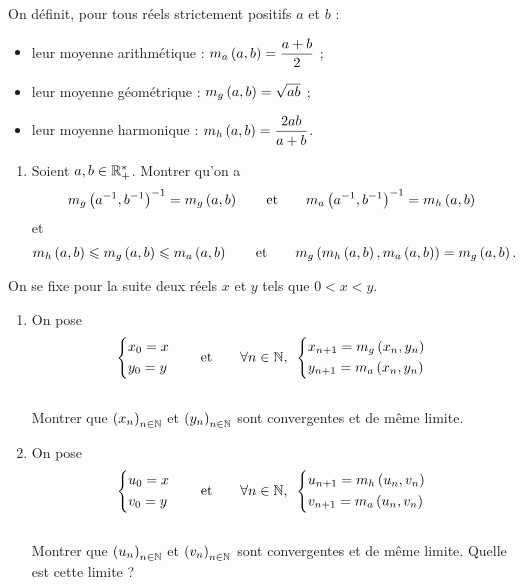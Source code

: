 \begin{exo}[Moyennes]
On définit, pour tous réels strictement positifs \(a\) et \(b\) :

\begin{itemize}
\item leur moyenne arithmétique : \(m_a\left(a,b\right)=\dfrac{a+b}{2}\) ; \\

\item leur moyenne géométrique : \(m_g\left(a,b\right)=\sqrt{ab}\) ; \\

\item leur moyenne harmonique : \(m_h\left(a,b\right)=\dfrac{2ab}{a+b}\).
\end{itemize}

\begin{enumerate}[series=exmoyennes]
\item Soient \(a,b\in\mathbb{R}_+^*\). Montrer qu'on a \[m_g\left(a^{-1},b^{-1}\right)^{-1}=m_g\left(a,b\right)\qquad\text{et}\qquad m_a\left(a^{-1},b^{-1}\right)^{-1}=m_h\left(a,b\right)\] et \[m_h\left(a,b\right)\leqslant m_g\left(a,b\right)\leqslant m_a\left(a,b\right)\qquad\text{et}\qquad m_g\left(m_h\left(a,b\right),m_a\left(a,b\right)\right)=m_g\left(a,b\right).\]
\end{enumerate}

On se fixe pour la suite deux réels \(x\) et \(y\) tels que \(0<x<y\).

\begin{enumerate}[resume=exmoyennes]
\item On pose \[\begin{dcases}x_0=x \\ y_0=y\end{dcases}\qquad\text{et}\qquad\quantifs{\forall n\in\N}\begin{dcases}x_{n+1}=m_g\paren{x_n,y_n} \\ y_{n+1}=m_a\paren{x_n,y_n}\end{dcases}\] \\

Montrer que \(\left(x_n\right)_{n\in\mathbb{N}}\) et \(\left(y_n\right)_{n\in\mathbb{N}}\) sont convergentes et de même limite. \\

\item On pose \[\begin{dcases}u_0=x \\ v_0=y\end{dcases}\qquad\text{et}\qquad\quantifs{\forall n\in\N}\begin{dcases}u_{n+1}=m_h\paren{u_n,v_n} \\ v_{n+1}=m_a\paren{u_n,v_n}\end{dcases}\] \\

Montrer que \(\left(u_n\right)_{n\in\mathbb{N}}\) et \(\left(v_n\right)_{n\in\mathbb{N}}\) sont convergentes et de même limite. Quelle est cette limite ?
\end{enumerate}
\end{exo}

